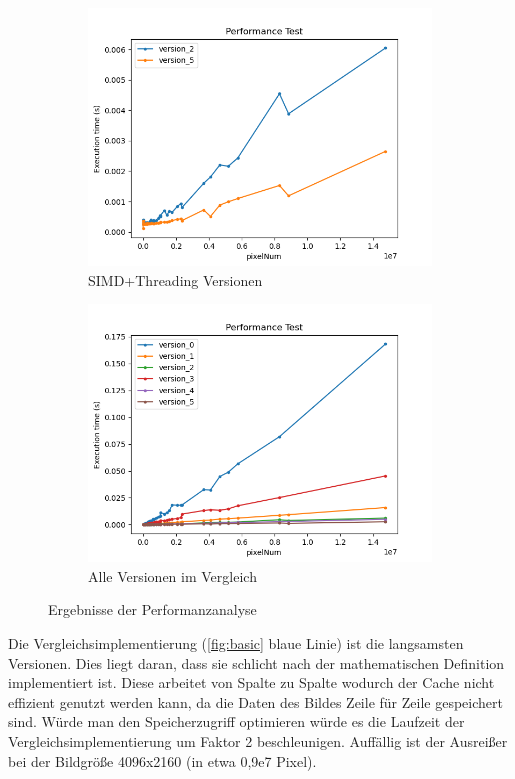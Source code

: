 \documentclass[course=erap]{aspdoc}
\begin{document}
\begin{figure}[H]
\begin{subfigure}{.5\columnwidth}
        \centering
        \includegraphics[width=\columnwidth]{graphics/version_2_5.png}
        \caption{SIMD+Threading Versionen}
        \label{fig:simd_threading}
    \end{subfigure}
    \begin{subfigure}{.5\columnwidth}
        \centering
        \includegraphics[width=\columnwidth]{graphics/all_without_spike.png}
        \caption{Alle Versionen im Vergleich}
        \label{fig:all}
    \end{subfigure}
    \caption{Ergebnisse der Performanzanalyse}
\end{figure}
Die Vergleichsimplementierung (\ref{fig:basic} blaue Linie) ist die langsamsten Versionen. Dies liegt daran, dass sie schlicht nach der mathematischen Definition implementiert ist.
Diese arbeitet von Spalte zu Spalte wodurch der Cache nicht effizient genutzt werden kann, da die Daten des Bildes Zeile für Zeile gespeichert sind.
Würde man den Speicherzugriff optimieren würde es die Laufzeit der Vergleichsimplementierung um Faktor 2 beschleunigen.
Auffällig ist der Ausreißer bei der Bildgröße 4096x2160 (in etwa 0,9e7 Pixel).
\end{document}
